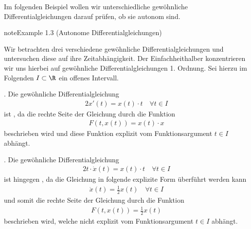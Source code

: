 \documentclass[letterpaper,10pt,english]{jupyterBook}
\begin{document}
\sphinxAtStartPar
Im folgenden Beispiel wollen wir unterschiedliche gewöhnliche Differentialgleichungen darauf prüfen, ob sie autonom sind.
\label{ode/repetition:example-4}
\begin{sphinxadmonition}{note}{Example 1.3 (Autonome Differentialgleichungen)}



\sphinxAtStartPar
Wir betrachten drei verschiedene gewöhnliche Differentialgleichungen und untersuchen diese auf ihre Zeitabhängigkeit.
Der Einfachheit\sphinxhyphen{}halber konzentrieren wir uns hierbei auf gewöhnliche Differentialgleichungen 1. Ordnung.
Sei hierzu  im Folgenden \(I \subset \R\) ein offenes Intervall.

. Die gewöhnliche Differentialgleichung
\begin{equation*}
\begin{split}2x'(t) = x(t)\cdot t \quad \forall t \in I\end{split}
\end{equation*}
\sphinxAtStartPar
ist , da die rechte Seite der Gleichung durch die Funktion
\begin{equation*}
\begin{split}F(t,x(t)) = x(t) \cdot x\end{split}
\end{equation*}
\sphinxAtStartPar
beschrieben wird und diese Funktion explizit vom Funktionsargument \(t \in I\) abhängt.



. Die gewöhnliche Differentialgleichung
\begin{equation*}
\begin{split}2t\cdot \dot{x}(t) = x(t)\cdot t \quad \forall t \in I\end{split}
\end{equation*}
\sphinxAtStartPar
ist hingegen , da die Gleichung in folgende explizite Form überführt werden kann
\begin{equation*}
\begin{split}\dot{x}(t) = \frac{1}{2} x(t) \quad \forall t \in I\end{split}
\end{equation*}
\sphinxAtStartPar
und somit die rechte Seite der Gleichung durch die Funktion
\begin{equation*}
\begin{split}F(t,x(t)) = \frac{1}{2}x(t)\end{split}
\end{equation*}
\sphinxAtStartPar
beschrieben wird, welche nicht explizit vom Funktionsargument \(t \in I\) abhängt.




\end{sphinxadmonition}
\end{document}
